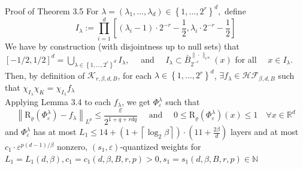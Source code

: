 \documentclass{if-beamer}
\begin{document}
\begin{frame}{Proof of Theorem 3.5}
    For $\lambda=\left(\lambda_{1}, \ldots, \lambda_{d}\right) \in\left\{1, \ldots, 2^{r}\right\}^{d},$ define
    \[
    I_{\lambda}:=\prod_{i=1}^{d}\left[\left(\lambda_{i}-1\right) \cdot 2^{-r}-\frac{1}{2}, \lambda_{i} \cdot 2^{-r}-\frac{1}{2}\right]
    \]
    We have by construction (with disjointness up to null sets) that
    $[-1 / 2,1 / 2]^{d}=\bigcup_{\lambda \in\left\{1, \ldots, 2^{r}\right\}^{d}} I_{\lambda}, \quad$ and $\quad I_{\lambda} \subset \bar{B}_{2^{-r}}^{\|\cdot\|_{e^{\infty}}}(x)$ for all $\quad x \in I_{\lambda}$.\\
    Then, by definition of $\mathcal{K}_{r,\beta,d,B}$, for each $\lambda \in \left\{1, \ldots, 2^{r}\right\}^{d}$, $\exists f_{\lambda} \in \mathcal{HF}_{\beta, d, B}$ such that $\chi_{I_{\lambda}} \chi_{K} = \chi_{I_{\lambda}}f_{\lambda}$\\
    Applying Lemma 3.4 to each $f_{\lambda}$, we get $\Phi_{\varepsilon}^{\lambda}$ such that
    {\small
    $$\left\|\mathrm{R}_{\varrho}\left(\Phi_{\varepsilon}^{\lambda}\right)-f_{\lambda}\right\|_{L^{p}} \leq \frac{\varepsilon}{2^{1+q+r d q}} \quad \text { and } \quad 0 \leq \mathrm{R}_{\varrho}\left(\Phi_{\varepsilon}^{\lambda}\right)(x) \leq 1 \quad \forall x \in \mathbb{R}^{d}
    $$
    }%
    and $\Phi_{\varepsilon}^{\lambda}$ has at most $L_1 \leq 14+\left(1+\left\lceil\log _{2} \beta\right\rceil\right) \cdot(11+\frac{2\beta}{d})$ layers and at most $c_1\cdot \varepsilon^{p(d-1)/\beta}$ nonzero, $(s_1, \varepsilon)$-quantized weights for $L_1 = L_1(d,\beta), c_1 = c_1(d,\beta, B, r, p)>0, s_1=s_1(d,\beta,B,r,p) \in \mathbb{N}$ 
\end{frame}
\end{document}
